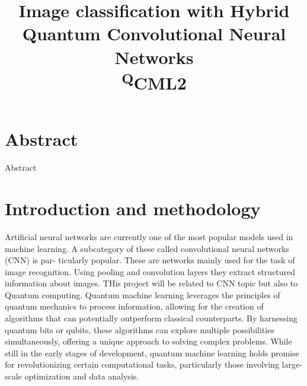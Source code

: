 \documentclass[conference]{IEEEtran}
\begin{document}
    \title{Image classification with Hybrid Quantum Convolutional Neural Networks\\
        {\footnotesize \textsuperscript QCML2}
        }
    
        \author{
        \and
        }


    \maketitle

\renewcommand{\contentsname}{Table of Contents}
\tableofcontents
\newpage

\section*{\fontsize{16}{20}\selectfont Abstract}

Abstract

\section*{\fontsize{16}{20}\selectfont Introduction and methodology}

Artificial neural networks are currently one of the most popular models used in machine
learning. A subcategory of these called convolutional neural networks (CNN) is par-
ticularly popular. These are networks mainly used for the task of image recognition. Using
pooling and convolution layers they extract structured information about images. THis
project will be related to CNN topic but also to Quantum computing. Quantum machine
learning leverages the principles of quantum mechanics to process information, allowing
for the creation of algorithms that can potentially outperform classical counterparts. By
harnessing quantum bits or qubits, these algorithms can explore multiple possibilities
simultaneously, offering a unique approach to solving complex problems. While still in the
early stages of development, quantum machine learning holds promise for revolutionizing
certain computational tasks, particularly those involving large-scale optimization and data
analysis.
\end{document}
